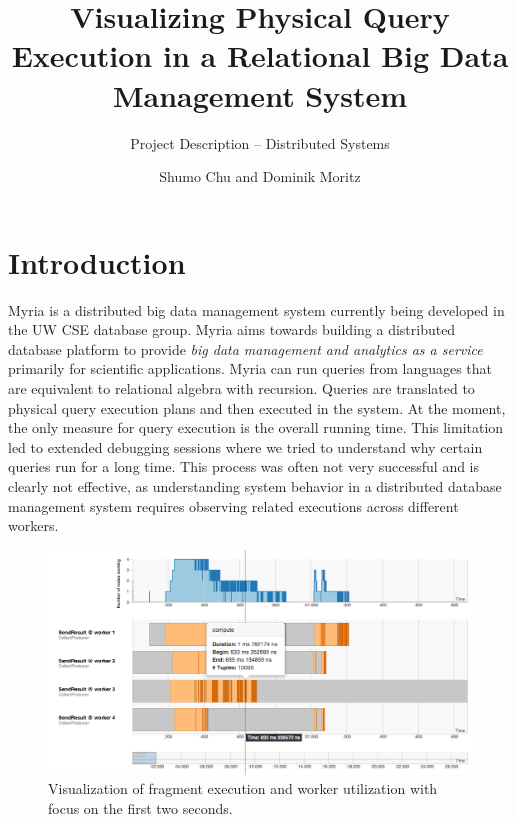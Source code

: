 \documentclass[11pt]{scrartcl}
\begin{document}

\title{Visualizing Physical Query Execution in a Relational Big Data Management System}
\subtitle{Project Description \--- Distributed Systems}
\author{Shumo Chu and Dominik Moritz}
\date{}

\maketitle

\section{Introduction}

Myria is a distributed big data management system currently being developed in the UW CSE database group. Myria aims towards building a distributed database platform to provide \emph{big data management and analytics as a service} primarily for scientific applications. Myria can run queries from languages that are equivalent to relational algebra with recursion. Queries are translated to physical query execution plans and then executed in the system. At the moment, the only measure for query execution is the overall running time. This limitation led to extended debugging sessions where we tried to understand why certain queries run for a long time. This process was often not very successful and is clearly not effective, as understanding system behavior in a distributed database management system requires observing related executions across different workers.

\begin{figure}[H]
  \begin{center}
    \includegraphics[width=.95\textwidth]{figure1}
  \end{center}
  \caption{Visualization of fragment execution and worker utilization with focus on the first two seconds.}
  \label{fig:fig1}
\end{figure}
\end{document}

